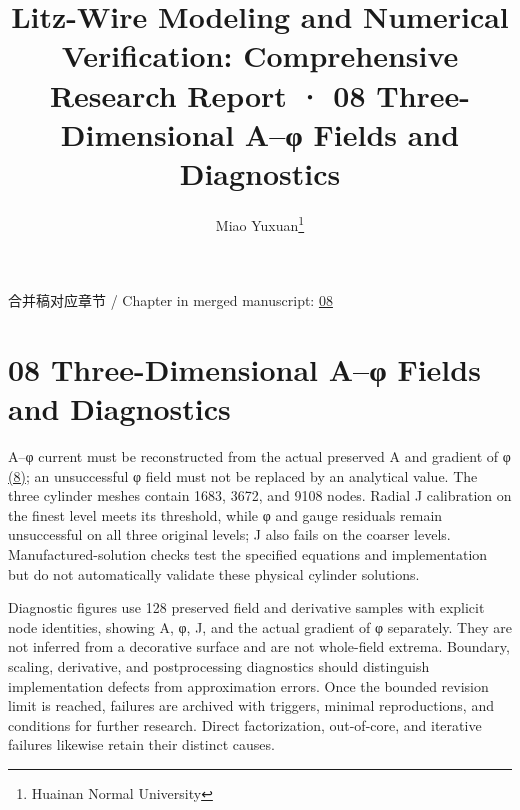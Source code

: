 \documentclass[journal,10pt]{IEEEtran}
\begin{document}
\title{Litz-Wire Modeling and Numerical Verification: Comprehensive Research Report · 08 Three-Dimensional A–φ Fields and Diagnostics}
\author{Miao Yuxuan\thanks{Huainan Normal University}}

\maketitle
\noindent 合并稿对应章节 / Chapter in merged manuscript: \href{report_en_ieee.pdf#chapter-08}{08}\par
\FloatBarrier
\section*{08 Three-Dimensional A–φ Fields and Diagnostics}
\hypertarget{chapter-08}{}
A–φ current must be reconstructed from the actual preserved A and gradient of φ \href{report_en_ieee.pdf#E07}{(8)}; an unsuccessful φ field must not be replaced by an analytical value. The three cylinder meshes contain 1683, 3672, and 9108 nodes. Radial J calibration on the finest level meets its threshold, while φ and gauge residuals remain unsuccessful on all three original levels; J also fails on the coarser levels. Manufactured-solution checks test the specified equations and implementation but do not automatically validate these physical cylinder solutions.


Diagnostic figures use 128 preserved field and derivative samples with explicit node identities, showing A, φ, J, and the actual gradient of φ separately. They are not inferred from a decorative surface and are not whole-field extrema. Boundary, scaling, derivative, and postprocessing diagnostics should distinguish implementation defects from approximation errors. Once the bounded revision limit is reached, failures are archived with triggers, minimal reproductions, and conditions for further research. Direct factorization, out-of-core, and iterative failures likewise retain their distinct causes.
\end{document}
